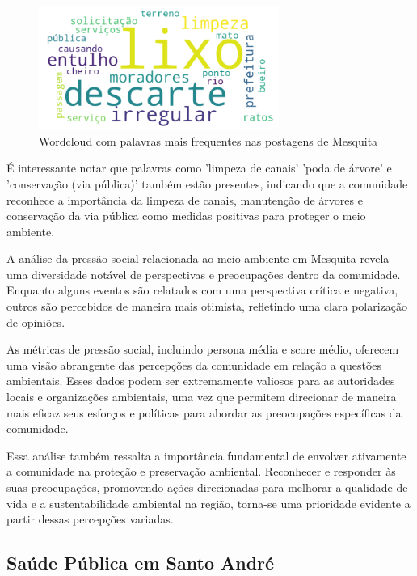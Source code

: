 \begin{figure}[htb]
	\centering
	\includegraphics[width=0.7\textwidth]{images/wordcloud_mesquita.png}
	\caption{Wordcloud com palavras mais frequentes nas postagens de Mesquita}
	\label{fig:wordcloud_mesquita}
\end{figure}

É interessante notar que palavras como 'limpeza de canais' 'poda de árvore' e 'conservação (via pública)' também estão presentes, indicando que a comunidade reconhece a importância da limpeza de canais, manutenção de árvores e conservação da via pública como medidas positivas para proteger o meio ambiente.

A análise da pressão social relacionada ao meio ambiente em Mesquita revela uma diversidade notável de perspectivas e preocupações dentro da comunidade. Enquanto alguns eventos são relatados com uma perspectiva crítica e negativa, outros são percebidos de maneira mais otimista, refletindo uma clara polarização de opiniões.

As métricas de pressão social, incluindo persona média e score médio, oferecem uma visão abrangente das percepções da comunidade em relação a questões ambientais. Esses dados podem ser extremamente valiosos para as autoridades locais e organizações ambientais, uma vez que permitem direcionar de maneira mais eficaz seus esforços e políticas para abordar as preocupações específicas da comunidade.

Essa análise também ressalta a importância fundamental de envolver ativamente a comunidade na proteção e preservação ambiental. Reconhecer e responder às suas preocupações, promovendo ações direcionadas para melhorar a qualidade de vida e a sustentabilidade ambiental na região, torna-se uma prioridade evidente a partir dessas percepções variadas.

\subsection{Saúde Pública em Santo André}

